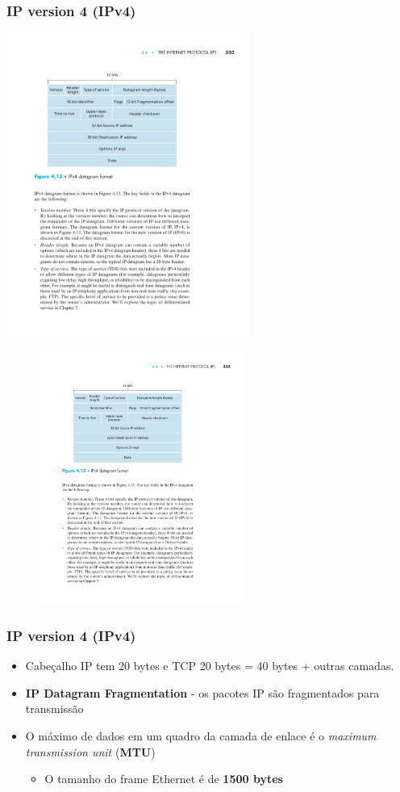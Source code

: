 \documentclass[xcolor=dvipsnames,10pt,compress,aspectratio=169]{beamer}
\begin{document}
\begin{frame}
  \frametitle{IP version 4 (IPv4)}
{
  \centering
  \includegraphics[width=0.6\textwidth]{kurose-04-02}
}
{
  \begin{figure}[ht]
  \centering
  \includegraphics[width=0.6\textwidth]{kurose-04-02}
  \end{figure}
}
\end{frame}

\begin{frame}
  \frametitle{IP version 4 (IPv4)}
  \begin{itemize}
  \item Cabeçalho IP tem 20 bytes e TCP 20 bytes = 40 bytes + outras camadas.
  \item \textbf{IP Datagram Fragmentation} - os pacotes IP são fragmentados para transmissão
  \item O máximo de dados em um quadro da camada de enlace é o \emph{maximum transmission unit} (\textbf{MTU})
    \begin{itemize}
    \item O tamanho do frame Ethernet é de \textbf{1500 bytes}
    \end{itemize}
  \end{itemize}
\end{frame}
\end{document}
